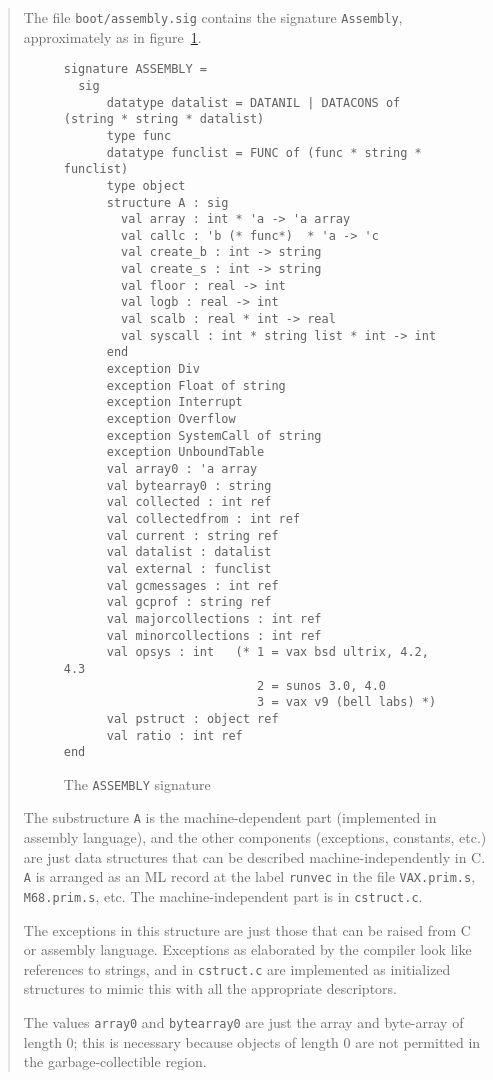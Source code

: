 \begin{quotation}
{\small The file \verb"boot/assembly.sig" contains the signature
\verb"Assembly", approximately as in figure~\ref{assembly}.
\begin{figure}
\label{assembly}
\begin{verbatim}
signature ASSEMBLY =
  sig
      datatype datalist = DATANIL | DATACONS of (string * string * datalist)
      type func
      datatype funclist = FUNC of (func * string * funclist)
      type object
      structure A : sig
        val array : int * 'a -> 'a array
        val callc : 'b (* func*)  * 'a -> 'c
        val create_b : int -> string
        val create_s : int -> string
        val floor : real -> int
        val logb : real -> int
        val scalb : real * int -> real
        val syscall : int * string list * int -> int
      end
      exception Div
      exception Float of string
      exception Interrupt
      exception Overflow
      exception SystemCall of string
      exception UnboundTable
      val array0 : 'a array
      val bytearray0 : string
      val collected : int ref
      val collectedfrom : int ref
      val current : string ref
      val datalist : datalist
      val external : funclist
      val gcmessages : int ref
      val gcprof : string ref
      val majorcollections : int ref
      val minorcollections : int ref
      val opsys : int   (* 1 = vax bsd ultrix, 4.2, 4.3
                           2 = sunos 3.0, 4.0 
                           3 = vax v9 (bell labs) *)
      val pstruct : object ref
      val ratio : int ref
end
\end{verbatim}
\caption{The {\tt ASSEMBLY} signature}
\end{figure}
The substructure \verb"A" is the machine-dependent part (implemented
in assembly language), and the other components (exceptions, constants,
etc.) are just data structures that can be described machine-independently
in C.  
\verb"A" is arranged as an ML record 
at the label \verb"runvec"
in the file \verb"VAX.prim.s", \verb"M68.prim.s",
etc.  The machine-independent part
is in \verb"cstruct.c".

The exceptions in this structure are just those that can be raised
from C or assembly language.  Exceptions as elaborated by the compiler
look like references to strings, and in \verb"cstruct.c" are implemented
as initialized structures to mimic this
with all the appropriate descriptors.

The values \verb"array0" and \verb"bytearray0" are just the array and
byte-array of length 0; this is necessary because objects of length 0
are not permitted in the garbage-collectible region.

}
\end{quotation}
